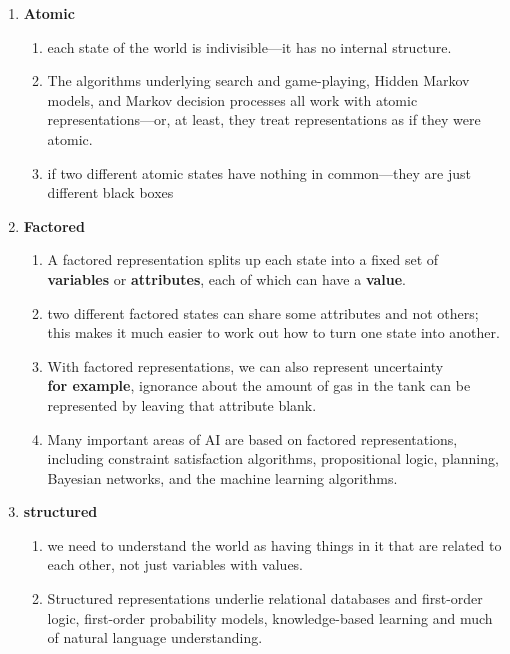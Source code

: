 \begin{enumerate}
    \item \textbf{Atomic}
    \begin{enumerate}
        \item each state of the world is indivisible—it has no internal structure. 
    
        \item The algorithms underlying search and game-playing, Hidden Markov models, and Markov decision processes all work with atomic representations—or, at least, they treat representations as if they were atomic.

        \item if two different atomic states have nothing in common—they are just different black boxes
    \end{enumerate}

    \item \textbf{Factored}
    \begin{enumerate}
        \item A factored representation splits up each state into a fixed set of \textbf{variables} or \textbf{attributes}, each of which can have a \textbf{value}.

        \item two different factored states can share some attributes and not others; this makes it much easier to work out how to turn one state into another.

        \item With factored representations, we can also represent uncertainty\\
        \textbf{for example}, ignorance about the amount of gas in the tank can be represented by leaving that attribute blank.

        \item  Many important areas of AI are based on factored representations, including constraint satisfaction algorithms, propositional logic, planning, Bayesian networks, and the machine learning algorithms.
    \end{enumerate}

    \item \textbf{structured}
    \begin{enumerate}
        \item we need to understand the world as having things in it that are
related to each other, not just variables with values.

        \item Structured representations underlie relational databases and first-order logic, first-order probability models, knowledge-based learning and much of natural language understanding. 
        

\end{enumerate}
\end{enumerate}
